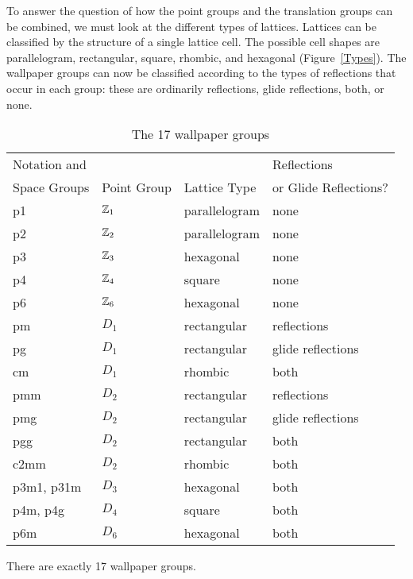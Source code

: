  
To answer the question of how the point groups and the translation
groups can be combined, we must look at the different types of
lattices. Lattices can be classified by the structure of a single
lattice cell. The possible cell shapes are parallelogram, rectangular,
square, rhombic, and hexagonal (Figure~\ref{Types}). The wallpaper
groups can now be classified according to the types of reflections
that occur in each group: these are ordinarily reflections, glide
reflections, both, or none.
 
 
 
\begin{table}[htb]
\caption{The 17 wallpaper groups}{\small
\begin{center}
\begin{tabular}{|l|l|l|l|}
\hline
Notation and &             &              & Reflections  \\
Space Groups & Point Group & Lattice Type & or Glide Reflections? \\
\hline
p1 & ${\Bbb Z}_1$ & parallelogram & none \\
p2 & ${\Bbb Z}_2$ & parallelogram & none \\
p3 & ${\Bbb Z}_3$ & hexagonal & none \\
p4 & ${\Bbb Z}_4$ & square & none \\
p6 & ${\Bbb Z}_6$ & hexagonal & none \\
pm & $D_1$ & rectangular & reflections \\
pg & $D_1$ & rectangular & glide reflections\\
cm & $D_1$ & rhombic & both \\
pmm & $D_2$ & rectangular & reflections \\
pmg & $D_2$ & rectangular & glide reflections \\
pgg & $D_2$ & rectangular & both \\
c2mm & $D_2$ & rhombic & both \\
p3m1, p31m & $D_3$ & hexagonal & both \\
p4m, p4g & $D_4$ & square & both \\
p6m & $D_6$ & hexagonal & both \\
\hline
\end{tabular} \label{table:wallpaper}
\end{center}
}
\end{table}
 
 
\begin{theorem}
There are exactly 17 wallpaper groups.
\end{theorem}
 

